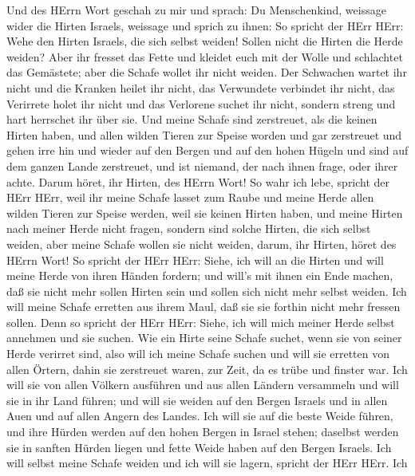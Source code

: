  Und des HErrn Wort geschah zu mir und sprach: 
Du Menschenkind, weissage wider die Hirten Israels, weissage und sprich
zu ihnen: So spricht der HErr HErr: Wehe den Hirten Israels, die sich
selbst weiden! Sollen nicht die Hirten die Herde weiden? 
Aber ihr fresset das Fette und kleidet euch mit der Wolle und schlachtet
das Gemästete; aber die Schafe wollet ihr nicht weiden.  Der
Schwachen wartet ihr nicht und die Kranken heilet ihr nicht, das
Verwundete verbindet ihr nicht, das Verirrete holet ihr nicht und das
Verlorene suchet ihr nicht, sondern streng und hart herrschet ihr über
sie.  Und meine Schafe sind zerstreuet, als die keinen
Hirten haben, und allen wilden Tieren zur Speise worden und gar
zerstreuet  und gehen irre hin und wieder auf den Bergen und
auf den hohen Hügeln und sind auf dem ganzen Lande zerstreuet, und ist
niemand, der nach ihnen frage, oder ihrer achte.  Darum
höret, ihr Hirten, des HErrn Wort!  So wahr ich lebe,
spricht der HErr HErr, weil ihr meine Schafe lasset zum Raube und meine
Herde allen wilden Tieren zur Speise werden, weil sie keinen Hirten
haben, und meine Hirten nach meiner Herde nicht fragen, sondern sind
solche Hirten, die sich selbst weiden, aber meine Schafe wollen sie
nicht weiden,  darum, ihr Hirten, höret des HErrn Wort!
 So spricht der HErr HErr: Siehe, ich will an die Hirten
und will meine Herde von ihren Händen fordern; und will's mit ihnen ein
Ende machen, daß sie nicht mehr sollen Hirten sein und sollen sich nicht
mehr selbst weiden. Ich will meine Schafe erretten aus ihrem Maul, daß
sie sie forthin nicht mehr fressen sollen.  Denn so spricht
der HErr HErr: Siehe, ich will mich meiner Herde selbst annehmen und sie
suchen.  Wie ein Hirte seine Schafe suchet, wenn sie von
seiner Herde verirret sind, also will ich meine Schafe suchen und will
sie erretten von allen Örtern, dahin sie zerstreuet waren, zur Zeit, da
es trübe und finster war.  Ich will sie von allen Völkern
ausführen und aus allen Ländern versammeln und will sie in ihr Land
führen; und will sie weiden auf den Bergen Israels und in allen Auen und
auf allen Angern des Landes.  Ich will sie auf die beste
Weide führen, und ihre Hürden werden auf den hohen Bergen in Israel
stehen; daselbst werden sie in sanften Hürden liegen und fette Weide
haben auf den Bergen Israels.  Ich will selbst meine Schafe
weiden und ich will sie lagern, spricht der HErr HErr.  Ich

